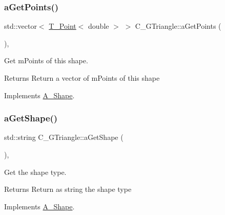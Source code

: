 \subsubsection{\texorpdfstring{a\+Get\+Points()}{aGetPoints()}\hspace{0.1cm}{\footnotesize\ttfamily [2/2]}}
{\footnotesize\ttfamily std\+::vector$<$ \hyperlink{classT__Point}{T\+\_\+\+Point}$<$ double $>$ $>$ C\+\_\+\+G\+Triangle\+::a\+Get\+Points (\begin{DoxyParamCaption}{ }\end{DoxyParamCaption})\hspace{0.3cm}{\ttfamily [override]}, {\ttfamily [virtual]}}



Get m\+Points of this shape. 

\begin{DoxyReturn}{Returns}
Return a vector of m\+Points of this shape 
\end{DoxyReturn}


Implements \hyperlink{classA__Shape_a9fd1285bd63b1fc88943c9969bf01a5c}{A\+\_\+\+Shape}.

\mbox{\label{classC__GTriangle_a039e79bb17dae01997b11243de457d98}} 
\subsubsection{\texorpdfstring{a\+Get\+Shape()}{aGetShape()}\hspace{0.1cm}{\footnotesize\ttfamily [1/2]}}
{\footnotesize\ttfamily std\+::string C\+\_\+\+G\+Triangle\+::a\+Get\+Shape (\begin{DoxyParamCaption}{ }\end{DoxyParamCaption})\hspace{0.3cm}{\ttfamily [override]}, {\ttfamily [virtual]}}



Get the shape type. 

\begin{DoxyReturn}{Returns}
Return as string the shape type 
\end{DoxyReturn}


Implements \hyperlink{classA__Shape_a1b202256a4e5dcb0edab4ab93a37122c}{A\+\_\+\+Shape}.

\mbox{\label{classC__GTriangle_a039e79bb17dae01997b11243de457d98}} 
